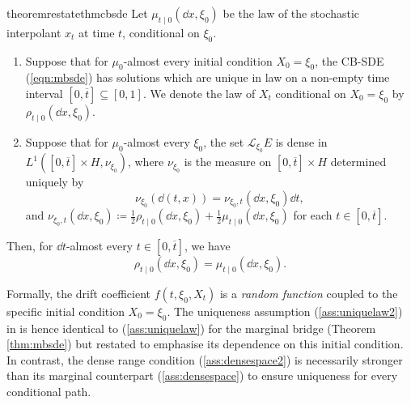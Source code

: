 \begin{restatable}{theorem}{restatethmcbsde}\label{thm:cbsde}
  Let \(\mu_{t\mid 0}(\dd{x}, \xi_{0})\) be the law of the stochastic interpolant \(x_{t}\) at time \(t\), conditional on \(\xi_{0}\).
  \begin{enumerate}
    \item \label{ass:uniquelaw2} Suppose that for \(\mu_{0}\)-almost every initial condition \(X_{0} = \xi_{0}\), the CB-SDE (\ref{eqn:mbsde}) has solutions which are unique in law on a non-empty time interval \([0, \overline{t}] \subseteq [0, 1]\). We denote the law of \(X_{t}\) conditional on \(X_{0} = \xi_{0}\) by \(\rho_{t \mid 0}(\dd{x}, \xi_{0})\).
    \item \label{ass:densespace2} Suppose that for \(\mu_{0}\)-almost every \(\xi_{0}\), the set \(\mathcal{L}_{\xi_{0}}E\) is dense in \(L^{1}([0, \overline{t} ]\times H, \nu_{\xi_{0}})\), where \(\nu_{\xi_{0}}\) is the measure on \([0, \overline{t}] \times H\) determined uniquely by
      \[
        \nu_{\xi_{0}}(\dd{(t, x)}) = \nu_{\xi_{0}, t}(\dd{x}, \xi_{0}) \dd{t},
      \]
      and \(\nu_{\xi_{0}, t}(\dd{x}, \xi_{0}) \coloneqq \frac{1}{2} \rho_{t \mid 0}(\dd{x}, \xi_{0}) + \frac{1}{2} \mu_{t\mid 0}(\dd{x}, \xi_{0})\) for each \(t \in [0, \overline{t}]\).

  \end{enumerate}

  Then, for \(\dd{t}\)-almost every \(t \in [0, \overline{t}]\), we have
  \[
    \rho_{t \mid 0}(\dd{x}, \xi_{0}) = \mu_{t \mid 0}(\dd{x}, \xi_{0}).
  \]
\end{restatable}

Formally, the drift coefficient \(f(t, \xi_{0}, X_{t})\) is a \textit{random function} coupled to the specific initial condition \(X_{0} = \xi_{0}\). The uniqueness assumption (\ref{ass:uniquelaw2}) in  is hence identical to (\ref{ass:uniquelaw}) for the marginal bridge (Theorem \ref{thm:mbsde}) but restated to emphasise its dependence on this initial condition. In contrast, the dense range condition (\ref{ass:densespace2}) is necessarily stronger than its marginal counterpart (\ref{ass:densespace}) to ensure uniqueness for every conditional path.

